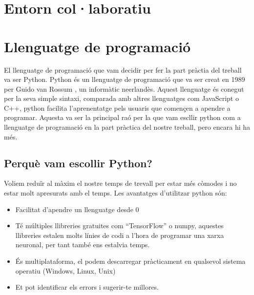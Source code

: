 \section{Entorn col·laboratiu}\label{sec:4.3}
\section{Llenguatge de programació}\label{sec:4.4}

El llenguatge de programació que vam decidir per fer la part pràctia del treball va ser Python. Python és un llenguatge de programació que va ser creat en 1989 per Guido van Rossum , un informàtic neerlandès. Aquest llenguatge és conegut per la seva simple sintaxi, comparada amb altres llenguatges com JavaScript o C++, python facilita l'aprenentatge pels usuaris que començen a apendre a programar. Aquesta va ser la principal raó per la que vam escllir python com a llenguatge de programació en la part pràctica del nostre treball, pero encara hi ha més.

\subsection{Perquè vam escollir Python?}
Voliem reduïr al màxim el nostre temps de trevall per estar més còmodes i no estar molt apresurats amb el temps. Les avantatges d'utilitzar python són:
\begin{itemize}
 \item Facilitat d'apendre un llenguatge desde 0
 \item Té múltiples llibreries gratuites com ``TensorFlow'' o numpy, aquestes llibreries estalen molts línies de codi a l'hora de programar una xarxa neuronal, per tant també ens estalvia temps.
 \item És multiplataforma, el podem descarregar pràcticament en qualsevol sistema operatiu (Windows, Linux, Unix)
 \item Et pot identificar els errors i sugerir-te millores.
\end{itemize}




